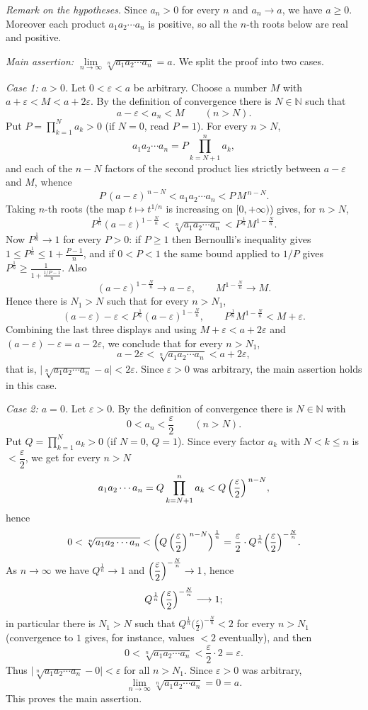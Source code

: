 \documentclass[11pt,a4paper]{article}
\newenvironment{solution}[1]{%
  \par\addvspace{1.7ex}%
  \noindent{\color{solutioncolor}\textbf{#1}}\hspace{0.55em}\ignorespaces}%
  {\par\addvspace{0.9ex}}
\begin{document}
\begin{solution}{Solution 2.1.10}\label{xs:2.1.10}
\emph{Remark on the hypotheses.} Since $a_n>0$ for every $n$ and $a_n\to a$, we have $a\ge 0$. Moreover each product $a_1a_2\cdots a_n$ is positive, so all the $n$-th roots below are real and positive.

\emph{Main assertion: $\lim\limits_{n\to\infty}\sqrt[n]{a_1a_2\cdots a_n}=a$.} We split the proof into two cases.

\emph{Case 1: $a>0$.} Let $0<\varepsilon<a$ be arbitrary. Choose a number $M$ with $a+\varepsilon<M<a+2\varepsilon$. By the definition of convergence there is $N\in\mathbb{N}$ such that
\[
a-\varepsilon<a_n<M\qquad(n>N).
\]
Put $P=\displaystyle\prod_{k=1}^{N}a_k>0$ (if $N=0$, read $P=1$). For every $n>N$,
\[
a_1a_2\cdots a_n=P\prod_{k=N+1}^{n}a_k ,
\]
and each of the $n-N$ factors of the second product lies strictly between $a-\varepsilon$ and $M$, whence
\[
P\,(a-\varepsilon)^{\,n-N}<a_1a_2\cdots a_n<P\,M^{\,n-N}.
\]
Taking $n$-th roots (the map $t\mapsto t^{1/n}$ is increasing on $[0,+\infty)$) gives, for $n>N$,
\[
P^{\frac1n}(a-\varepsilon)^{1-\frac Nn}<\sqrt[n]{a_1a_2\cdots a_n}<P^{\frac1n}M^{1-\frac Nn}.
\]
Now $P^{\frac1n}\to 1$ for every $P>0$: if $P\ge 1$ then Bernoulli's inequality gives $1\le P^{\frac1n}\le 1+\frac{P-1}{n}$, and if $0<P<1$ the same bound applied to $1/P$ gives $P^{\frac1n}\ge\frac{1}{1+\frac{1/P-1}{n}}$. Also
\[
(a-\varepsilon)^{1-\frac Nn}\to a-\varepsilon,\qquad M^{1-\frac Nn}\to M .
\]
Hence there is $N_1>N$ such that for every $n>N_1$,
\[
(a-\varepsilon)-\varepsilon<P^{\frac1n}(a-\varepsilon)^{1-\frac Nn},
\qquad
P^{\frac1n}M^{1-\frac Nn}<M+\varepsilon .
\]
Combining the last three displays and using $M+\varepsilon<a+2\varepsilon$ and $(a-\varepsilon)-\varepsilon=a-2\varepsilon$, we conclude that for every $n>N_1$,
\[
a-2\varepsilon<\sqrt[n]{a_1a_2\cdots a_n}<a+2\varepsilon ,
\]
that is, $\bigl|\sqrt[n]{a_1a_2\cdots a_n}-a\bigr|<2\varepsilon$. Since $\varepsilon>0$ was arbitrary, the main assertion holds in this case.

\emph{Case 2: $a=0$.} Let $\varepsilon>0$. By the definition of convergence
there is $N\in\mathbb{N}$ with
\[
0<a_n<\frac\varepsilon2\qquad(n>N).
\]
Put $Q=\displaystyle\prod_{k=1}^{N}a_k>0$ (if $N=0$, $Q=1$). Since every factor
$a_k$ with $N<k\le n$ is $<\dfrac\varepsilon2$, we get for every $n>N$
\[
a_1a_2\cdots a_n=Q\prod_{k=N+1}^{n}a_k<Q\,\Bigl(\frac\varepsilon2\Bigr)^{\,n-N},
\]
hence
\[
0<\sqrt[n]{a_1a_2\cdots a_n}
<\Bigl(Q\,\Bigl(\frac\varepsilon2\Bigr)^{\,n-N}\Bigr)^{\frac1n}
=\frac\varepsilon2\cdot Q^{\frac1n}\Bigl(\frac\varepsilon2\Bigr)^{-\frac Nn}.
\]
As $n\to\infty$ we have $Q^{\frac1n}\to 1$ and
$\Bigl(\dfrac\varepsilon2\Bigr)^{-\frac Nn}\to 1$, hence
\[
Q^{\frac1n}\Bigl(\frac\varepsilon2\Bigr)^{-\frac Nn}\longrightarrow 1 ;
\]
in particular there is $N_1>N$ such that
$Q^{\frac1n}\bigl(\frac\varepsilon2\bigr)^{-\frac Nn}<2$ for every $n>N_1$
(convergence to $1$ gives, for instance, values $<2$ eventually), and then
\[
0<\sqrt[n]{a_1a_2\cdots a_n}<\frac\varepsilon2\cdot 2=\varepsilon .
\]
Thus $\bigl|\sqrt[n]{a_1a_2\cdots a_n}-0\bigr|<\varepsilon$ for all $n>N_1$. Since $\varepsilon>0$ was arbitrary,
\[
\lim_{n\to\infty}\sqrt[n]{a_1a_2\cdots a_n}=0=a .
\]
This proves the main assertion.


\end{solution}
\end{document}
